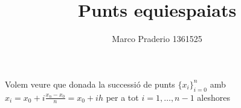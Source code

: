 \documentclass[a4paper,10pt]{article}
\title{Punts equiespaiats}
\author{Marco Praderio 1361525}
\date{}
\begin{document}
\maketitle
Volem veure que donada la successió de punts $\{x_i\}_{i=0}^n$ amb $x_i=x_0+i\frac{x_n-x_0}{n}=x_0+ih$ per a tot $i=1,\dots,n-1$ aleshores
\end{document}
